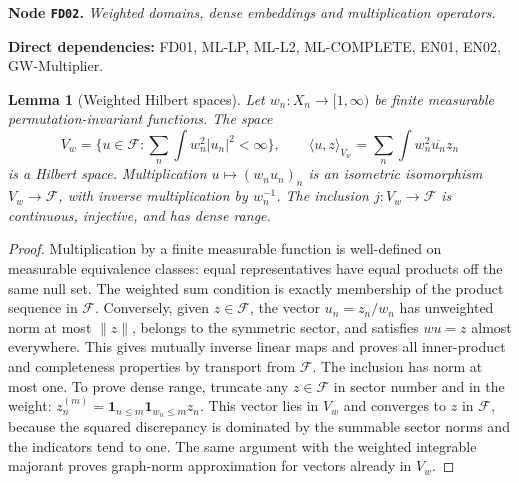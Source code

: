 \documentclass[11pt,a4paper]{article}
\newtheorem{lemma}[theorem]{Lemma}
\theoremstyle{remark}\newtheorem{remark}[theorem]{Remark}
\newcommand{\F}{\mathcal F}\newcommand{\Q}{\mathcal Q}\newcommand{\HH}{\mathcal H}
\newcommand{\node}[3]{\par\Needspace{6\baselineskip}\smallskip\hypertarget{node:#1}{}\label{nodepage:#1}\noindent\textbf{Node \texttt{#1}.} \textit{#2.}\par\noindent\textbf{Direct dependencies:} #3.\par}
\begin{document}
\node{FD02}{Weighted domains, dense embeddings and multiplication operators}{FD01, ML-LP, ML-L2, ML-COMPLETE, EN01, EN02, GW-Multiplier}
\begin{lemma}[Weighted Hilbert spaces]\label{lem:weightedspace}
Let $w_n:X_n\to[1,\infty)$ be finite measurable permutation-invariant functions. The space
\[
 V_w=\{u\in\F:\sum_n\int w_n^2|u_n|^2<\infty\},\qquad
 \langle u,z\rangle_{V_w}=\sum_n\int w_n^2\overline{u_n}z_n
\]
is a Hilbert space. Multiplication $u\mapsto(w_nu_n)_n$ is an isometric isomorphism $V_w\to\F$, with inverse multiplication by $w_n^{-1}$. The inclusion $j:V_w\to\F$ is continuous, injective, and has dense range.
\end{lemma}
\begin{proof}
Multiplication by a finite measurable function is well-defined on measurable equivalence classes: equal representatives have equal products off the same null set. The weighted sum condition is exactly membership of the product sequence in $\F$. Conversely, given $z\in\F$, the vector $u_n=z_n/w_n$ has unweighted norm at most $\|z\|$, belongs to the symmetric sector, and satisfies $wu=z$ almost everywhere. This gives mutually inverse linear maps and proves all inner-product and completeness properties by transport from $\F$. The inclusion has norm at most one. To prove dense range, truncate any $z\in\F$ in sector number and in the weight: $z^{(m)}_n=\mathbf1_{n\leq m}\mathbf1_{w_n\leq m}z_n$. This vector lies in $V_w$ and converges to $z$ in $\F$, because the squared discrepancy is dominated by the summable sector norms and the indicators tend to one. The same argument with the weighted integrable majorant proves graph-norm approximation for vectors already in $V_w$.
\end{proof}
\end{document}
